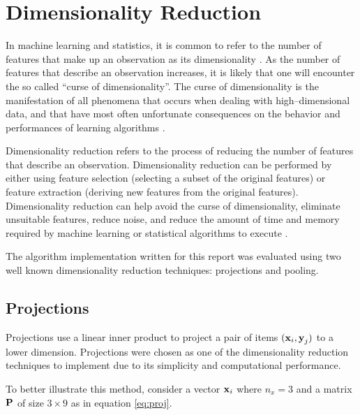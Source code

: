 \section{Dimensionality Reduction} \label{sect:theory:dim-reduction}
In machine learning and statistics, it is common to refer to the number of features that make up an observation as its dimensionality \cite{book:intro-to-dm}. As the number of features that describe an observation increases, it is likely that one will encounter the so called ``curse of dimensionality''. The curse of dimensionality is the manifestation of all phenomena that occurs when dealing with high--dimensional data, and that have most often unfortunate consequences on the behavior and performances of learning algorithms \cite{article:curse-of-dim}. \newline

Dimensionality reduction refers to the process of reducing the number of features that describe an observation. Dimensionality reduction can be performed by either using feature selection (selecting a subset of the original features) or feature extraction (deriving new features from the original features). Dimensionality reduction can help avoid the curse of dimensionality, eliminate unsuitable features, reduce noise, and reduce the amount of time and memory required by machine learning or statistical algorithms to execute \cite{book:intro-to-dm}. \newline

The \mlblink algorithm implementation written for this report was evaluated using two well known dimensionality reduction techniques: projections and pooling.

\subsection{Projections} \label{sect:theory:dim-reduction:proj}
Projections use a linear inner product to project a pair of items $(\boldsymbol{\mathbf{x}}_i, \boldsymbol{\mathbf{y}}_j)$ to a lower dimension. Projections were chosen as one of the dimensionality reduction techniques to implement due to its simplicity and computational performance. \newline

To better illustrate this method, consider a vector $\boldsymbol{\mathbf{x}}_i$ where $n_x=3$ and a matrix $\boldsymbol{\mathbf{P}}$ of size $3 \times 9$ as in equation \ref{eq:proj}.

